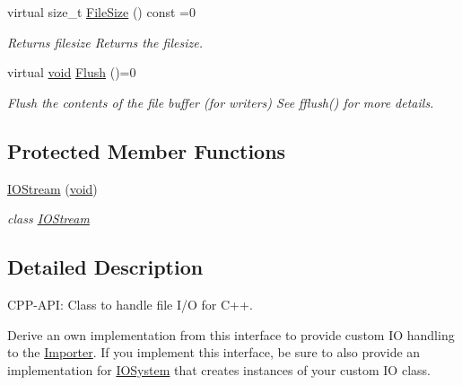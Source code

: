 \begin{DoxyCompactItemize}
virtual size\-\_\-t \hyperlink{class_assimp_1_1_i_o_stream_aaa01183d197fb714f28d6c611b6fa058}{File\-Size} () const =0
\begin{DoxyCompactList}\small\item\em Returns filesize Returns the filesize. \end{DoxyCompactList}\item 
virtual \hyperlink{wglew_8h_aeea6e3dfae3acf232096f57d2d57f084}{void} \hyperlink{class_assimp_1_1_i_o_stream_a7c19952446ece90924b246f087417899}{Flush} ()=0
\begin{DoxyCompactList}\small\item\em Flush the contents of the file buffer (for writers) See fflush() for more details. \end{DoxyCompactList}\end{DoxyCompactItemize}
\subsection*{Protected Member Functions}
\begin{DoxyCompactItemize}
\item 
\hyperlink{class_assimp_1_1_i_o_stream_af5ae78123b6c6f7afc31b2a52dc9192e}{I\-O\-Stream} (\hyperlink{wglew_8h_aeea6e3dfae3acf232096f57d2d57f084}{void})
\begin{DoxyCompactList}\small\item\em class \hyperlink{class_assimp_1_1_i_o_stream}{I\-O\-Stream} \end{DoxyCompactList}\end{DoxyCompactItemize}


\subsection{Detailed Description}
C\-P\-P-\/\-A\-P\-I\-: Class to handle file I/\-O for C++. 

Derive an own implementation from this interface to provide custom I\-O handling to the \hyperlink{class_assimp_1_1_importer}{Importer}. If you implement this interface, be sure to also provide an implementation for \hyperlink{class_assimp_1_1_i_o_system}{I\-O\-System} that creates instances of your custom I\-O class. 

